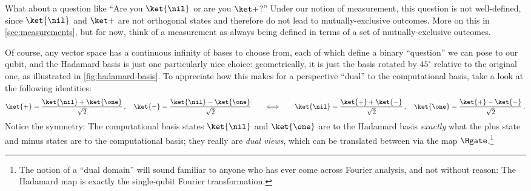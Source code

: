       What about a question like ``Are you $\ket{\nil}$ or
        are you $\ket +$?'' Under our notion of measurement, this question is not
        well-defined, since $\ket{\nil}$ and $\ket +$ are not orthogonal states and
        therefore do not lead to mutually-exclusive outcomes. More on this in
        \cref{sec:measurements}, but for now, think of a measurement as always
        being defined in terms of a set of mutually-exclusive outcomes.

	    Of course, any vector space has a continuous infinity of 
	      bases to choose from, each of which define a binary ``question'' we
	      can pose to our qubit, and the Hadamard
	      basis is just one particularly nice choice:
	      geometrically, it is just the basis rotated by $45^\circ$
	      relative to the original one, as illustrated in
	      \cref{fig:hadamard-basis}.
	      To appreciate how this makes for a perspective
         ``dual'' to the computational basis,
	      take a look at the following identities:
        \[
          \ket{+} = \frac{\ket{\nil} + \ket{\one}}{\sqrt{2}}\, , \quad 
          \ket{-} = \frac{\ket{\nil} - \ket{\one}}{\sqrt{2}}
          \qquad
          \Longleftrightarrow
          \qquad
          \ket{\nil} = \frac{\ket{+} + \ket{-}}{\sqrt{2}}\, , \quad 
          \ket{\one} = \frac{\ket{+} - \ket{-}}{\sqrt{2}}\, .
        \]
        Notice the symmetry: The computational basis states $\ket{\nil}$ and $\ket{\one}$
        are to the Hadamard basis \emph{exactly} what the plus state and minus
        states are to the computational basis; they really are \emph{dual views},
        which can be translated between via the map $\Hgate$.\footnote{
          The notion of a ``dual domain'' will sound familiar to anyone who has
          ever come across Fourier analysis, and not without reason: The Hadamard
          map is exactly the single-qubit Fourier transformation.
        }

